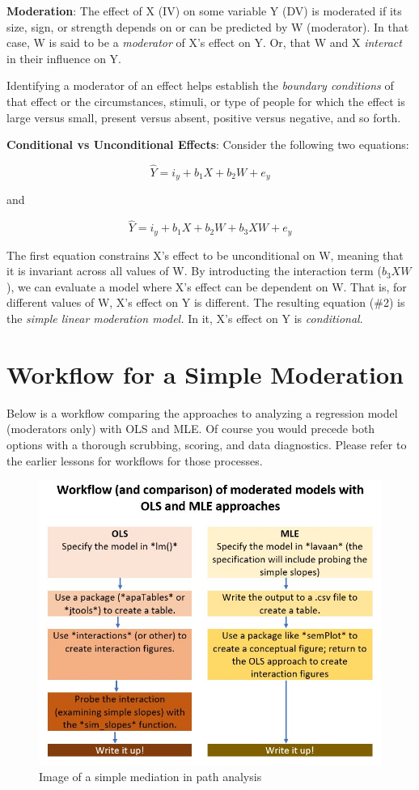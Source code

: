 \documentclass[
  11pt,
]{book}
\begin{document}
\textbf{Moderation}: The effect of X (IV) on some variable Y (DV) is moderated if its size, sign, or strength depends on or can be predicted by W (moderator). In that case, W is said to be a \emph{moderator} of X's effect on Y. Or, that W and X \emph{interact} in their influence on Y.

Identifying a moderator of an effect helps establish the \emph{boundary conditions} of that effect or the circumstances, stimuli, or type of people for which the effect is large versus small, present versus absent, positive versus negative, and so forth.

\textbf{Conditional vs Unconditional Effects}: Consider the following two equations:

\[\hat{Y} = i_{y}+b_{1}X + b_{2}W + e_{y}\]

and

\[\hat{Y} = i_{y}+b_{1}X + b_{2}W + b_{3}XW+ e_{y}\]

The first equation constrains X's effect to be unconditional on W, meaning that it is invariant across all values of W. By introducting the interaction term (\(b_{3}XW\)), we can evaluate a model where X's effect can be dependent on W. That is, for different values of W, X's effect on Y is different. The resulting equation (\#2) is the \emph{simple linear moderation model.} In it, X's effect on Y is \emph{conditional}.

\hypertarget{workflow-for-a-simple-moderation}{%
\section{Workflow for a Simple Moderation}\label{workflow-for-a-simple-moderation}}

Below is a workflow comparing the approaches to analyzing a regression model (moderators only) with OLS and MLE. Of course you would precede both options with a thorough scrubbing, scoring, and data diagnostics. Please refer to the earlier lessons for workflows for those processes.

\begin{figure}
\centering
\includegraphics{images/SimpleMod/OLS_MLEwrkflow.jpg}
\caption{Image of a simple mediation in path analysis}
\end{figure}
\end{document}
